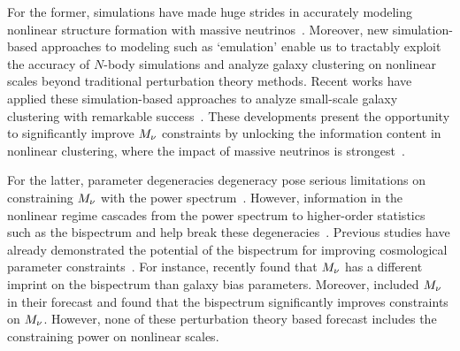 For the former, simulations have made huge strides in accurately modeling 
nonlinear structure formation with massive neutrinos~\citep[\eg][]{brandbyge2008, 
villaescusa-navarro2013, castorina2015, adamek2017, emberson2017, banerjee2018, 
villaescusa-navarro2018a, yoshikawa2020, villaescusa-navarro2020a}. Moreover, new simulation-based
approaches to modeling such as `emulation' enable us to tractably exploit the accuracy of 
$N$-body simulations and analyze galaxy clustering on nonlinear scales beyond
traditional perturbation theory methods. Recent works have applied
these simulation-based approaches to analyze small-scale galaxy clustering with
remarkable success~\citep[\eg][]{heitmann2009a, kwan2015, euclidcollaboration2018, lange2019, zhai2019, wibking2019}. 
These developments present the opportunity to significantly improve $M_\nu$
constraints by unlocking the information content in nonlinear clustering, where
the impact of massive neutrinos is strongest~\citep[\eg][]{brandbyge2008,
saito2008, wong2008, saito2009, viel2010, agarwal2011, marulli2011, bird2012,
castorina2015, banerjee2016, upadhye2016, banerjee2020, allys2020, massara2020,
uhlemann2020}.

For the latter, parameter degeneracies degeneracy pose serious limitations on 
constraining 
$M_\nu$ with the power spectrum~\citep{villaescusa-navarro2018a}. However, 
information in the nonlinear regime cascades
from the power spectrum to higher-order statistics such as the bispectrum 
and help break these degeneracies~\citep{hahn2020}. Previous studies have 
already demonstrated the potential of the bispectrum for improving cosmological 
parameter constraints~\citep{sefusatti2005, sefusatti2006, chan2017, yankelevich2019,
agarwal2020, kamalinejad2020}.
For instance, \cite{kamalinejad2020} recently found that $M_\nu$ has a different 
imprint on the bispectrum than galaxy bias parameters.
Moreover, \cite{chudaykin2019} included $M_\nu$ in their forecast and
found that the bispectrum significantly improves constraints on $M_\nu$.
However, none of these perturbation theory based forecast includes the
constraining power on nonlinear scales. 

